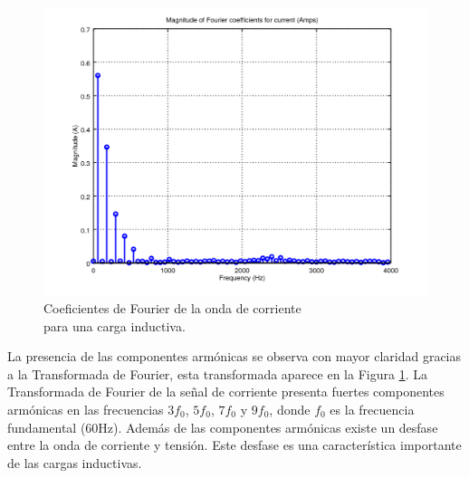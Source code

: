 \documentclass[journal]{IEEEtran}
\begin{document}
\begin{figure}[h]
\centering
\includegraphics[clip,width=\columnwidth]
{zoomed_current_furier_coefficients_drill.png}
\caption{Coeficientes de Fourier de la  
onda de corriente \\ para una carga inductiva.}
\label{fourier_corrent_coefficients_inductive}
\end{figure}

La presencia de las componentes armónicas se observa 
con mayor claridad gracias a la Transformada de Fourier, 
esta transformada aparece en la Figura 
\ref{fourier_corrent_coefficients_inductive}.
La Transformada de Fourier de la señal de corriente 
presenta fuertes componentes armónicas en las frecuencias
$3 f_0$, $5 f_0$, $7 f_0$  y $9 f_0$, donde $f_0$ es la 
frecuencia fundamental (60Hz). Además de las componentes 
armónicas existe un desfase entre la onda de corriente 
y tensión. Este desfase es una característica importante 
de las cargas inductivas. \\

\end{document}
